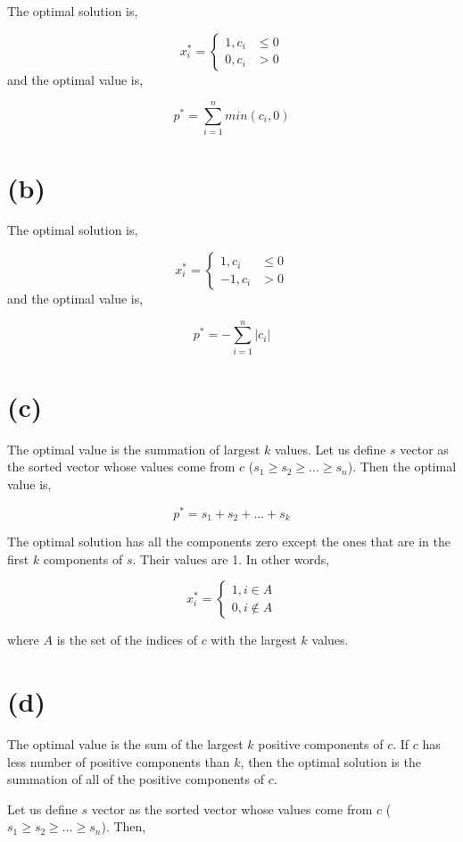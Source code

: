 \documentclass[]{report}
\begin{document}
The optimal solution is,

\[ x_i^* = \begin{cases} 
1, c_i &\leq 0 \\
0, c_i &> 0 
\end{cases}
\] 
and the optimal value is,

\[ p^* = \sum_{i=1}^{n}min(c_i,0)\]

\section*{(b)}

The optimal solution is,

\[ x_i^* = \begin{cases} 
1, c_i &\leq 0 \\
-1, c_i &> 0 
\end{cases}
\] 
and the optimal value is,

\[ p^* = -\sum_{i=1}^{n}|c_i|\]
\section*{(c)}

The optimal value is the summation of largest $k$ values. Let us define $s$ vector as the sorted vector whose values come from $c$ ($s_1 \geq s_2 \geq ... \geq s_n$). Then the optimal value is,

\[p^* = s_1 + s_2 + ... + s_k\]

The optimal solution has all the components zero except the ones that are in the first $k$ components of $s$. Their values are 1. In other words,

\[ x_i^* = \begin{cases} 
1, i \in A \\
0, i \notin A  
\end{cases}
\]

where $A$ is the set of the indices of $c$ with the largest $k$ values. 

\section*{(d)}

The optimal value is the sum of the largest $k$ positive components of $c$. If $c$ has less number of positive components than $k$, then the optimal solution is the summation of all of the positive components of $c$.

Let us define $s$ vector as the sorted vector whose values come from $c$ ($s_1 \geq s_2 \geq ... \geq s_n$). Then,
\end{document}
